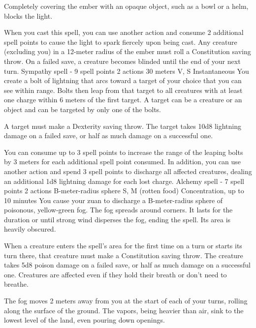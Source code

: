     Completely covering the ember with an opaque object, such as a bowl or a helm, blocks the light.

    When you cast this spell, you can use another action and consume 2 additional spell points to cause the light to spark fiercely upon being cast.
    Any creature (excluding you) in a 12-meter radius of the ember must roll a Constitution saving throw.
    On a failed save, a creature becomes blinded until the end of your next turn.
    {Sympathy spell - 9 spell points}
    {2 actions}
    {30 meters}
    {V, S}
    {Instantaneous}
    You create a bolt of lightning that arcs toward a target of your choice that you can see within range.
    Bolts then leap from that target to all creatures with at least one charge within 6 meters of the first target.
    A target can be a creature or an object and can be targeted by only one of the bolts.

    A target must make a Dexterity saving throw.
    The target takes 10d8 lightning damage on a failed save, or half as much damage on a successful one.

    You can consume up to 3 spell points to increase the range of the leaping bolts by 3 meters for each additional spell point consumed.
    In addition, you can use another action and spend 3 spell points to discharge all affected creatures, dealing an additional 1d8 lightning damage for each lost charge.
    {Alchemy spell - 7 spell points}
    {2 actions}
    {B-meter-radius sphere}
    {S, M (rotten food)}
    {Concentration, up to 10 minutes}
    You cause your zuan to discharge a B-meter-radius sphere of poisonous, yellow-green fog.
    The fog spreads around corners.
    It lasts for the duration or until strong wind disperses the fog, ending the spell.
    Its area is heavily obscured.

    When a creature enters the spell's area for the first time on a turn or starts its turn there, that creature must make a Constitution saving throw.
    The creature takes 5d8 poison damage on a failed save, or half as much damage on a successful one.
    Creatures are affected even if they hold their breath or don't need to breathe.

    The fog moves 2 meters away from you at the start of each of your turns, rolling along the surface of the ground.
    The vapors, being heavier than air, sink to the lowest level of the land, even pouring down openings.

